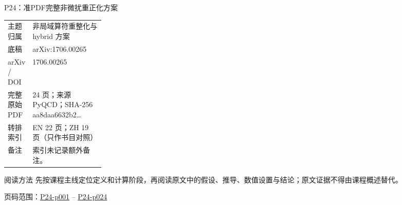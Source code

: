 \documentclass[aspectratio=169,10pt]{ctexbeamer}
\begin{document}
\begin{frame}[t]{P24：准PDF完整非微扰重正化方案}
\small\begin{tabularx}{\linewidth}{p{0.22\linewidth}Y}
\toprule 主题归属 & 非局域算符重整化与 hybrid 方案\\
底稿 & arXiv:1706.00265\\
arXiv / DOI & 1706.00265\\
完整原始 PDF & 24 页；来源 PyQCD；SHA-256 aa8daa6632b2\ldots\\
转排索引 & EN 22 页；ZH 19 页（只作书目对照）\\
备注 & 索引未记录额外备注。\\
\bottomrule\end{tabularx}\vspace{0.25cm}
\begin{block}{阅读方法}
先按课程主线定位定义和计算阶段，再阅读原文中的假设、推导、数值设置与结论；原文证据不得由课程概述替代。
\end{block}
\vfill 页码范围：\hyperlink{P24-p001}{P24-p001} -- \hyperlink{P24-p024}{P24-p024}
\end{frame}
\end{document}
